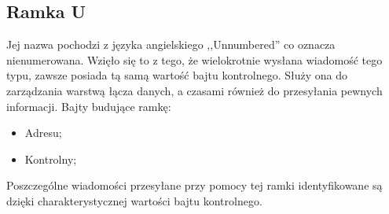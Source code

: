 \subsection{Ramka U}
Jej nazwa pochodzi z języka angielskiego ,,Unnumbered'' co oznacza nienumerowana.\autocite{WIKI_ENG_HDLC}
Wzięło się to z tego, że wielokrotnie wysłana wiadomość tego typu, zawsze posiada tą samą wartość bajtu kontrolnego.
Służy ona do zarządzania warstwą łącza danych, a czasami również do przesyłania pewnych informacji.
\newline
Bajty budujące ramkę:
\begin{itemize}
	\item Adresu;
	\item Kontrolny;
\end{itemize}
Poszczególne wiadomości przesyłane przy pomocy tej ramki identyfikowane są dzięki charakterystycznej wartości bajtu kontrolnego.

